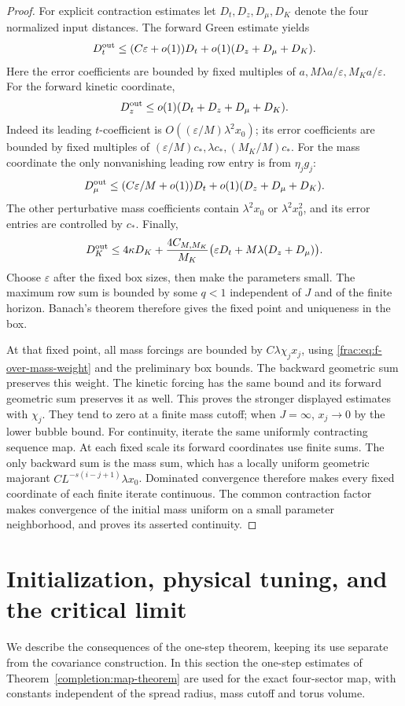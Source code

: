 \documentclass[11pt]{article}
\begin{document}
\begin{proof}
For explicit contraction estimates let
\(D_t,D_z,D_\mu,D_K\) denote the four normalized input distances.
The forward Green estimate yields
\[
 D_t^{\rm out}\le(C\varepsilon+o(1))D_t
                       +o(1)(D_z+D_\mu+D_K).
\]
Here the error coefficients are bounded by fixed multiples of
\(a,M\lambda a/\varepsilon,M_Ka/\varepsilon\).
For the forward kinetic coordinate,
\[
 D_z^{\rm out}\le o(1)(D_t+D_z+D_\mu+D_K).
\]
Indeed its leading \(t\)-coefficient is
\(O((\varepsilon/M)\lambda^2x_0)\); its error coefficients are
bounded by fixed multiples of
\((\varepsilon/M)c_*,\lambda c_*,(M_K/M)c_*\).
For the mass coordinate the only nonvanishing leading row entry is
from \(\eta_jg_j\):
\[
 D_\mu^{\rm out}\le(C\varepsilon/M+o(1))D_t
                         +o(1)(D_z+D_\mu+D_K).
\]
The other perturbative mass coefficients contain
\(\lambda^2x_0\) or \(\lambda^2x_0^2\), and its error entries
are controlled by \(c_*\). Finally,
\[
 D_K^{\rm out}\le4\kappa D_K+
 \frac{4C_{M,M_K}}{M_K}
       \bigl(\varepsilon D_t+M\lambda(D_z+D_\mu)\bigr).
\]
Choose \(\varepsilon\) after the fixed box sizes, then make the
parameters small. The maximum row sum is bounded by some \(q<1\)
independent of \(J\) and of the finite horizon. Banach's theorem
therefore gives the fixed point and uniqueness in the box.

At that fixed point, all mass forcings are bounded by
\(C\lambda\chi_jx_j\), using
\eqref{frac:eq:f-over-mass-weight} and the preliminary box bounds.
The backward geometric sum preserves this weight. The kinetic
forcing has the same bound and its forward geometric sum preserves
it as well. This proves the stronger displayed estimates with
\(\chi_j\). They tend to zero at a finite mass cutoff; when
\(J=\infty\), \(x_j\to0\) by the lower bubble bound.
For continuity, iterate the same uniformly contracting sequence map.
At each fixed scale its forward coordinates use finite sums. The only
backward sum is the mass sum, which has a locally uniform geometric
majorant \(CL^{-s(i-j+1)}\lambda x_0\). Dominated convergence
therefore makes every fixed coordinate of each finite iterate
continuous. The common contraction factor makes convergence of the
initial mass uniform on a small parameter neighborhood, and proves
its asserted continuity.
\end{proof}


\section{Initialization, physical tuning, and the critical limit}
\label{completion:flow-closure}
We describe the consequences of the one-step theorem, keeping its use
separate from the covariance construction. In this section the
one-step estimates of Theorem~\ref{completion:map-theorem} are used
for the exact four-sector map, with constants independent of the
spread radius, mass cutoff and torus volume.
\end{document}
